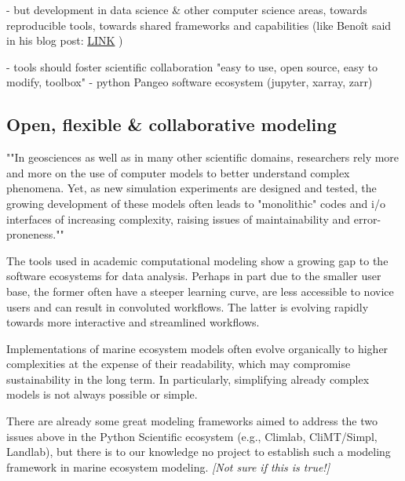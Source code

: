 \documentclass[journal abbreviation, manuscript]{copernicus}
\begin{document}
- but development in data science \& other computer science areas, towards reproducible tools, towards shared frameworks and capabilities (like Benoît said in his blog post: \href{https://medium.com/pangeo/pangeo-data-and-models-280b251ff0cd}{LINK} )

- tools should foster scientific collaboration
"easy to use, open source, easy to modify, toolbox"
- python Pangeo software ecosystem (jupyter, xarray, zarr)


\subsection{Open, flexible \& collaborative modeling}



""In geosciences as well as in many other scientific domains, researchers rely more and more on the use of computer models to better understand complex phenomena. Yet, as new simulation experiments are designed and tested, the growing development of these models often leads to "monolithic" codes and i/o interfaces of increasing complexity, raising issues of maintainability and error-proneness.""

The tools used in academic computational modeling show a growing gap to the software ecosystems for data analysis. Perhaps in part due to the smaller user base, the former often have a steeper learning curve, are less accessible to novice users and can result in convoluted workflows. The latter is evolving rapidly towards more interactive and streamlined workflows.

Implementations of marine ecosystem models often evolve organically to higher complexities at the expense of their readability, which may compromise sustainability in the long term. In particularly, simplifying already complex models is not always possible or simple.

There are already some great modeling frameworks aimed to address the two issues above in the Python Scientific ecosystem (e.g., Climlab, CliMT/Simpl, Landlab), but there is to our knowledge no project to establish such a modeling framework in marine ecosystem modeling. \textit{[Not sure if this is true!]}
\end{document}
